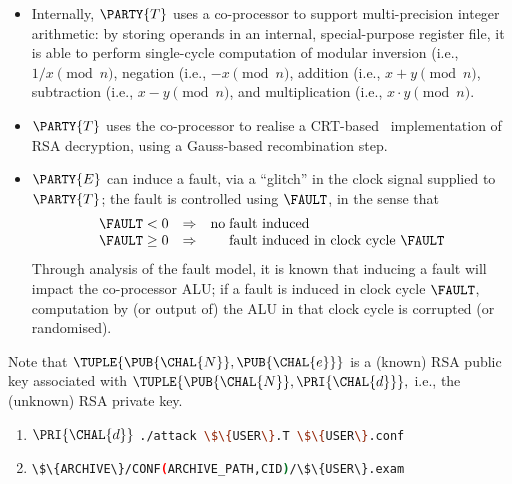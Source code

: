 \begin{itemize}
\item Internally, 
      $\PARTY{T}$ 
      uses a co-processor to support multi-precision integer arithmetic: by
      storing operands in an internal, special-purpose register file, it is
      able to perform single-cycle computation of modular
           inversion (i.e., $1 / x     \pmod{n}$,
            negation (i.e., $  - x     \pmod{n}$,
            addition (i.e., $x +     y \pmod{n}$,
         subtraction (i.e., $x -     y \pmod{n}$,
      and
      multiplication (i.e., $x \cdot y \pmod{n}$.
\item $\PARTY{T}$ 
      uses the co-processor to realise a CRT-based~\cite{SCALE:QuiCou:82} 
      implementation of RSA decryption, using a Gauss-based recombination 
      step.
\item $\PARTY{E}$
      can induce a fault, via a ``glitch'' in the clock signal supplied to
      $\PARTY{T}$;
      the fault is controlled using $\FAULT$, in the sense that
      \[
      \begin{array}{c@{\;}c@{\;}c c c@{\;}l}
      \FAULT &<   & 0 &\Rightarrow& \mbox{no} & \mbox{fault induced                        } \\
      \FAULT &\geq& 0 &\Rightarrow&           & \mbox{fault induced in clock cycle $\FAULT$} \\
      \end{array}
      \]
      Through analysis of the fault model, it is known that inducing a fault 
      will impact the co-processor ALU; if a fault is induced in clock cycle
      $\FAULT$, computation by (or output of) the ALU in that clock cycle is
      corrupted (or randomised).
\end{itemize}


%
Note that
$
\TUPLE{ \PUB{\CHAL{N}}, \PUB{\CHAL{e}} }
$
is
a     (known) RSA public  key 
associated with 
$
\TUPLE{ \PUB{\CHAL{N}}, \PRI{\CHAL{d}} } ,
$
i.e.,
the (unknown) RSA private key.



\begin{enumerate}
\item \DESCTASKIMPL
      {$\PRI{\CHAL{d}}$}
      {\mbox{\lstinline[language={bash}]|./attack \$\{USER\}.T \$\{USER\}.conf|}}
\item \DESCTASKEXAM
      {\mbox{\lstinline[language={bash}]|\$\{ARCHIVE\}/CONF(ARCHIVE_PATH,CID)/\$\{USER\}.exam|}}
\end{enumerate}

